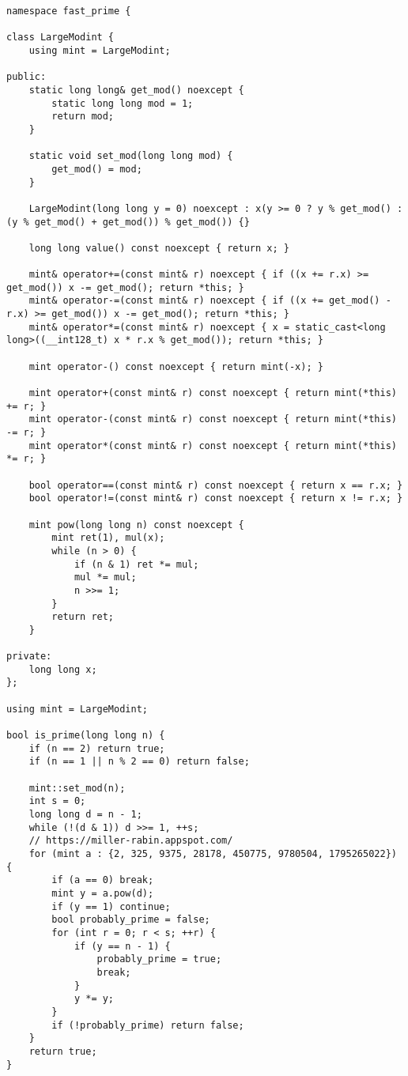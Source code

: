 \begin{lstlisting}
namespace fast_prime {

class LargeModint {
    using mint = LargeModint;

public:
    static long long& get_mod() noexcept {
        static long long mod = 1;
        return mod;
    }

    static void set_mod(long long mod) {
        get_mod() = mod;
    }

    LargeModint(long long y = 0) noexcept : x(y >= 0 ? y % get_mod() : (y % get_mod() + get_mod()) % get_mod()) {}

    long long value() const noexcept { return x; }

    mint& operator+=(const mint& r) noexcept { if ((x += r.x) >= get_mod()) x -= get_mod(); return *this; }
    mint& operator-=(const mint& r) noexcept { if ((x += get_mod() - r.x) >= get_mod()) x -= get_mod(); return *this; }
    mint& operator*=(const mint& r) noexcept { x = static_cast<long long>((__int128_t) x * r.x % get_mod()); return *this; }

    mint operator-() const noexcept { return mint(-x); }

    mint operator+(const mint& r) const noexcept { return mint(*this) += r; }
    mint operator-(const mint& r) const noexcept { return mint(*this) -= r; }
    mint operator*(const mint& r) const noexcept { return mint(*this) *= r; }

    bool operator==(const mint& r) const noexcept { return x == r.x; }
    bool operator!=(const mint& r) const noexcept { return x != r.x; }

    mint pow(long long n) const noexcept {
        mint ret(1), mul(x);
        while (n > 0) {
            if (n & 1) ret *= mul;
            mul *= mul;
            n >>= 1;
        }
        return ret;
    }

private:
    long long x;
};

using mint = LargeModint;

bool is_prime(long long n) {
    if (n == 2) return true;
    if (n == 1 || n % 2 == 0) return false;

    mint::set_mod(n);
    int s = 0;
    long long d = n - 1;
    while (!(d & 1)) d >>= 1, ++s;
    // https://miller-rabin.appspot.com/
    for (mint a : {2, 325, 9375, 28178, 450775, 9780504, 1795265022}) {
        if (a == 0) break;
        mint y = a.pow(d);
        if (y == 1) continue;
        bool probably_prime = false;
        for (int r = 0; r < s; ++r) {
            if (y == n - 1) {
                probably_prime = true;
                break;
            }
            y *= y;
        }
        if (!probably_prime) return false;
    }
    return true;
}


\end{lstlisting}
